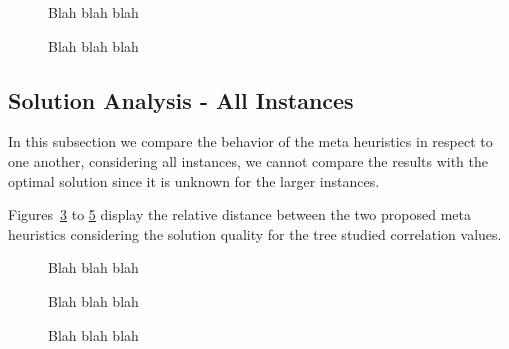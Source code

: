 \begin{figure}
\centering
\missingfigure[figwidth=8cm]{}
\caption{Blah blah blah}
\label{fig:mh2_2}
\end{figure}

\begin{figure}
\centering
\missingfigure[figwidth=8cm]{}
\caption{Blah blah blah}
\label{fig:mh2_3}
\end{figure}


\subsection{Solution Analysis - All Instances}

In this subsection we compare the behavior of the meta heuristics in respect to one another,
considering all instances, we cannot compare the results with the optimal solution since it is unknown
for the larger instances.

Figures~\ref{fig:comp_1} to \ref{fig:comp_3} display the relative distance between the two proposed meta
heuristics considering the solution quality for the tree studied correlation values.

\begin{figure}
\centering
\missingfigure[figwidth=8cm]{}
\caption{Blah blah blah}
\label{fig:comp_1}
\end{figure}

\begin{figure}
\centering
\missingfigure[figwidth=8cm]{}
\caption{Blah blah blah}
\label{fig:comp_2}
\end{figure}

\begin{figure}
\centering
\missingfigure[figwidth=8cm]{}
\caption{Blah blah blah}
\label{fig:comp_3}
\end{figure}

